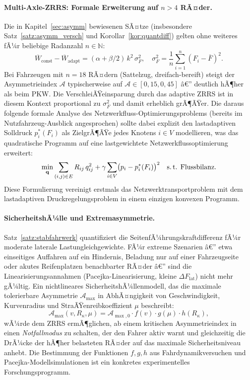 ﻿\documentclass[a4paper,12pt]{article}
\theoremstyle{definition}
\begin{document}
\paragraph{Multi-Axle-ZRRS: Formale Erweiterung auf $n > 4$ RÃ¤der.}
Die in Kapitel~\ref{sec:asymm} bewiesenen SÃ¤tze
(insbesondere Satz~\ref{satz:asymm_versch} und Korollar~\ref{kor:quantdiff})
gelten ohne weiteres fÃ¼r beliebige Radanzahl $n \in \mathbb{N}$:
\[
    \overline{W}_{\text{const}} - \overline{W}_{\text{adapt}}
    = (\alpha + \beta/2)\,k^2\,\sigma^2_F,
    \quad
    \sigma^2_F = \frac{1}{n}\sum_{i=1}^{n}(F_i - \bar{F})^2.
\]
Bei Fahrzeugen mit $n = 18$ RÃ¤dern (Sattelzug, dreifach-bereift)
steigt der Asymmetrieindex $\mathcal{A}$ typischerweise auf
$\mathcal{A} \in [0{,}15, 0{,}45]$ â€” deutlich hÃ¶her als beim PKW.
Die VerschleiÃŸeinsparung durch das adaptive ZRRS ist in
diesem Kontext proportional zu $\sigma_F^2$ und damit erheblich
grÃ¶ÃŸer. Die daraus folgende formale Analyse des Netzwerk\-fluss-Optimierungs\-problems
(bereits im Nutzfahrzeug-Ausblick angesprochen) sollte dabei explizit
den lastadaptiven Solldruck $p^*_i(F_i)$ als ZielgrÃ¶ÃŸe jedes Knotens
$i \in V$ modellieren, was das quadratische Programm auf eine
lastgewichtete Netzwerkflussoptimierung erweitert:
\[
    \min_{\mathbf{q}} \sum_{(i,j)\in E} R_{ij}\,q_{ij}^2
    + \gamma \sum_{i \in V} \bigl(p_i - p^*_i(F_i)\bigr)^2
    \quad \text{s.\,t. Flussbilanz.}
\]
Diese Formulierung vereinigt erstmals das Netzwerktransportproblem mit dem
lastadaptiven Druckregelungsproblem in einem einzigen konvexen Programm.

\paragraph{SicherheitshÃ¼lle und Extremasymmetrie.}
Satz~\ref{satz:stabfahrwerk} quantifiziert die SeitenfÃ¼hrungs\-kraftdifferenz
fÃ¼r moderate laterale Lastungleichgewichte. FÃ¼r extreme Szenarien â€”
etwa einseitiges Auffahren auf ein Hindernis, Beladung nur auf
einer Fahrzeugseite oder akutes Reifenplatzen benachbarter RÃ¤der â€” sind
die Linearisierungsannahmen (Pacejka-Linearisierung, kleine
$\Delta F_{\text{lat}}$) nicht mehr gÃ¼ltig. Ein nichtlineares Sicherheits\-hÃ¼llenmodell,
das die maximale tolerierbare Asymmetrie $\mathcal{A}_{\max}$ in AbhÃ¤ngigkeit
von Geschwindigkeit, Kurvenradius und StraÃŸenreibkoeffizient $\mu$ beschreibt:
\[
    \mathcal{A}_{\max}(v, R_{\kappa}, \mu)
    = \mathcal{A}_{\max,0} \cdot f(v)\cdot g(\mu) \cdot h(R_{\kappa}),
\]
wÃ¼rde dem ZRRS ermÃ¶glichen, ab einem kritischen Asymmetrieindex in einen
\emph{Notfallmodus} zu schalten, der den Fahrer aktiv warnt und
gleichzeitig die DrÃ¼cke der hÃ¶her belasteten RÃ¤der auf das maximale
Sicherheitsniveau anhebt. Die Bestimmung der Funktionen $f, g, h$ aus
Fahrdynamikversuchen und Pacejka-Modellsimulationen \cite{pacejka}
ist ein konkretes experimentelles Forschungsprogramm.
\end{document}
